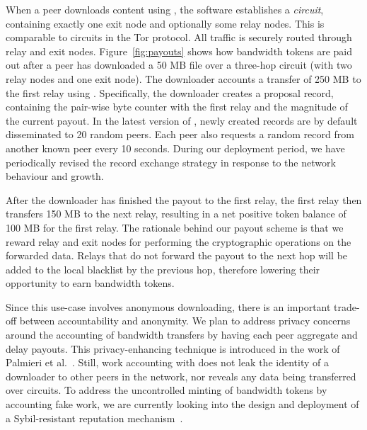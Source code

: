 When a peer downloads content using \Tribler{}, the \Tribler{} software establishes a \emph{circuit}, containing exactly one exit node and optionally some relay nodes.
This is comparable to circuits in the Tor protocol.
All traffic is securely routed through relay and exit nodes.
Figure~\ref{fig:payouts} shows how bandwidth tokens are paid out after a peer has downloaded a 50 MB file over a three-hop circuit (with two relay nodes and one exit node).
The downloader accounts a transfer of 250 MB to the first relay using \ModelName{}.
Specifically, the downloader creates a proposal record, containing the pair-wise byte counter with the first relay and the magnitude of the current payout.
In the latest version of \Tribler{}, newly created records are by default disseminated to 20 random peers.
Each peer also requests a random record from another known peer every 10 seconds.
During our deployment period, we have periodically revised the record exchange strategy in response to the network behaviour and growth.

After the downloader has finished the payout to the first relay, the first relay then transfers 150 MB to the next relay, resulting in a net positive token balance of 100 MB for the first relay.
The rationale behind our payout scheme is that we reward relay and exit nodes for performing the cryptographic operations on the forwarded data.
Relays that do not forward the payout to the next hop will be added to the local blacklist by the previous hop, therefore lowering their opportunity to earn bandwidth tokens.

Since this use-case involves anonymous downloading, there is an important trade-off between accountability and anonymity.
We plan to address privacy concerns around the accounting of bandwidth transfers by having each peer aggregate and delay payouts.
This privacy-enhancing technique is introduced in the work of Palmieri et al.~\cite{palmieri2015paying}.
Still, work accounting with \ModelName{} does not leak the identity of a downloader to other peers in the network, nor reveals any data being transferred over circuits.
To address the uncontrolled minting of bandwidth tokens by accounting fake work, we are currently looking into the design and deployment of a Sybil-resistant reputation mechanism~\cite{otte2017trustchain}.


